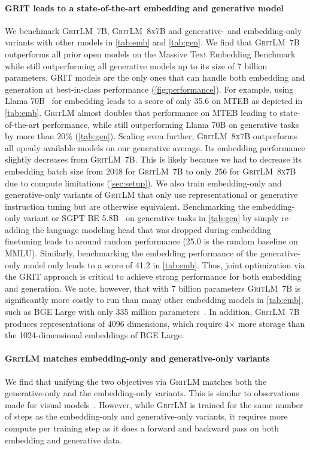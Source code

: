 \documentclass{article}
\newcommand{\model}{\textsc{GritLM}}
\newcommand{\modelbase}{\textsc{GritLM~7B}}
\newcommand{\modelbig}{\textsc{GritLM~8x7B}}
\newcommand{\method}{\textsc{GRIT}}
\newcommand{\llama}{Llama}
\begin{document}
\paragraph{\method{} leads to a state-of-the-art embedding and generative model} We benchmark \modelbase{}, \modelbig{} and generative- and embedding-only variants with other models in \autoref{tab:emb} and \autoref{tab:gen}. We find that \modelbase{} outperforms all prior open models on the Massive Text Embedding Benchmark~\citep{muennighoff2023mteb} while still outperforming all generative models up to its size of 7 billion parameters. \method{} models are the only ones that can handle both embedding and generation at best-in-class performance (\autoref{fig:performance}). For example, using \llama{} 70B~\cite{touvron2023llama} for embedding leads to a score of only 35.6 on MTEB as depicted in \autoref{tab:emb}. \model{} almost doubles that performance on MTEB leading to state-of-the-art performance, while still outperforming \llama{} 70B on generative tasks by more than 20\% (\autoref{tab:gen}). Scaling even further, \modelbig{} outperforms all openly available models on our generative average. Its embedding performance slightly decreases from \modelbase{}. This is likely because we had to decrease its embedding batch size from 2048 for \modelbase{} to only 256 for \modelbig{} due to compute limitations (\autoref{sec:setup}). We also train embedding-only and generative-only variants of \model{} that only use representational or generative instruction tuning but are otherwise equivalent. Benchmarking the embedding-only variant or SGPT BE 5.8B~\cite{muennighoff2022sgpt} on generative tasks in \autoref{tab:gen} by simply re-adding the language modeling head that was dropped during embedding finetuning leads to around random performance (25.0 is the random baseline on MMLU). Similarly, benchmarking the embedding performance of the generative-only model only leads to a score of 41.2 in \autoref{tab:emb}. Thus, joint optimization via the \method{} approach is critical to achieve strong performance for both embedding and generation. We note, however, that with 7 billion parameters \modelbase{} is significantly more costly to run than many other embedding models in \autoref{tab:emb}, such as BGE Large with only 335 million parameters~\cite{xiao2023cpack}. In addition, \modelbase{} produces representations of 4096 dimensions, which require 4$\times$ more storage than the 1024-dimensional embeddings of BGE Large.

\paragraph{\model{} matches embedding-only and generative-only variants} We find that unifying the two objectives via \model{} matches both the generative-only and the embedding-only variants. This is similar to observations made for visual models~\cite{yu2022coca}. However, while \model{} is trained for the same number of steps as the embedding-only and generative-only variants, it requires more compute per training step as it does a forward and backward pass on both embedding and generative data.
\end{document}
